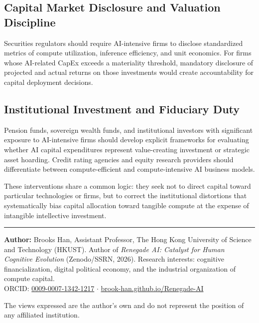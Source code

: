 \documentclass[11pt,letterpaper]{article}
\begin{document}
\subsection{Capital Market Disclosure and Valuation Discipline}

Securities regulators should require AI-intensive firms to disclose standardized metrics of compute utilization, inference efficiency, and unit economics. For firms whose AI-related CapEx exceeds a materiality threshold, mandatory disclosure of projected and actual returns on those investments would create accountability for capital deployment decisions.

\subsection{Institutional Investment and Fiduciary Duty}

Pension funds, sovereign wealth funds, and institutional investors with significant exposure to AI-intensive firms should develop explicit frameworks for evaluating whether AI capital expenditures represent value-creating investment or strategic asset hoarding. Credit rating agencies and equity research providers should differentiate between compute-efficient and compute-intensive AI business models.

These interventions share a common logic: they seek not to direct capital toward particular technologies or firms, but to correct the institutional distortions that systematically bias capital allocation toward tangible compute at the expense of intangible intellective investment.

\vspace{12pt}
\noindent\rule{\textwidth}{0.4pt}
\vspace{12pt}

\begin{flushleft}
\textbf{Author:} Brooks Han, Assistant Professor, The Hong Kong University of Science and Technology (HKUST). Author of \textit{Renegade AI: Catalyst for Human Cognitive Evolution} (Zenodo/SSRN, 2026). Research interests: cognitive financialization, digital political economy, and the industrial organization of compute capital.\\[4pt]
ORCID: \href{https://orcid.org/0009-0007-1342-1217}{0009-0007-1342-1217} $\cdot$ \href{https://brook-han.github.io/Renegade-AI}{brook-han.github.io/Renegade-AI}
\end{flushleft}

\vspace{6pt}
{\footnotesize The views expressed are the author's own and do not represent the position of any affiliated institution.}
\end{document}

